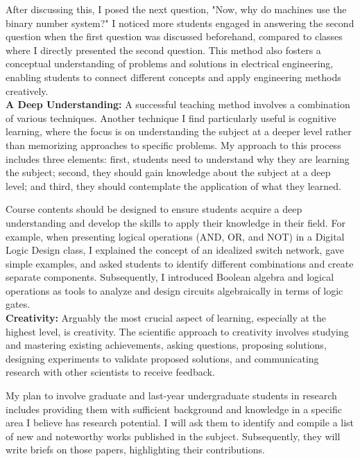After discussing this, I posed the next question, "Now, why do machines use the binary number system?" I noticed more students engaged in answering the second question when the first question was discussed beforehand, compared to classes where I directly presented the second question. This method also fosters a conceptual understanding of problems and solutions in electrical engineering, enabling students to connect different concepts and apply engineering methods creatively.
    \\[0.2cm]
   {\bf A Deep Understanding:}
   A successful teaching method involves a combination of various techniques. Another technique I find particularly useful is cognitive learning, where the focus is on understanding the subject at a deeper level rather than memorizing approaches to specific problems. My approach to this process includes three elements: first, students need to understand why they are learning the subject;
    second, they should gain knowledge about the subject at a deep level; and third, they should contemplate the application of what they learned. 
    
    Course contents should be designed to ensure students acquire a deep understanding and develop the skills to apply their knowledge in their field. For example, when presenting logical operations (AND, OR, and NOT) in a Digital Logic Design class, I explained the concept of an idealized switch network, gave simple examples, and asked students to identify different combinations and create separate components. Subsequently, I introduced Boolean algebra and logical operations as tools to analyze and design circuits algebraically in terms of logic gates.
    \\[0.2cm]
   {\bf Creativity:}
Arguably the most crucial aspect of learning, especially at the highest level, is creativity. The scientific approach to creativity involves studying and mastering existing achievements, asking questions, proposing solutions, designing experiments to validate proposed solutions, and communicating research with other scientists to receive feedback. 

My plan to involve graduate and last-year undergraduate students in research includes providing them with sufficient background and knowledge in a specific area I believe has research potential. I will ask them to identify and compile a list of new and noteworthy works published in the subject. Subsequently, they will write briefs on those papers, highlighting their contributions.


